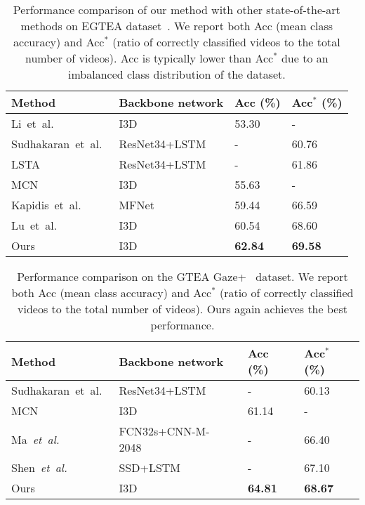 \documentclass[10pt,twocolumn,letterpaper]{article}
\begin{document}
\begin{table*}[t]
\centering
\begin{tabular}{L{4.6cm}|L{4.6cm}|C{2.3cm}|C{2.3cm}}
\toprule
Method & Backbone network & Acc (\%) & Acc$^{*}$ (\%) \\ \midrule
Li~et~al.~\cite{li2018eye} & I3D~\cite{carreira2017quo} & 53.30 & - \\
Sudhakaran~et~al.~\cite{sudhakaran2018attention} & ResNet34+LSTM~\cite{he2016deep,xingjian2015convolutional} & - & 60.76 \\
LSTA~\cite{sudhakaran2019lsta} & ResNet34+LSTM~\cite{he2016deep,xingjian2015convolutional} & - & 61.86 \\
MCN~\cite{huang2019mutual} & I3D~\cite{carreira2017quo} & 55.63 & - \\
Kapidis~et~al.~\cite{kapidis2019multitask} & MFNet~\cite{chen2018multi} & 59.44 & 66.59 \\
Lu~et~al.~\cite{lu2019learning} & I3D~\cite{carreira2017quo} & 60.54 & 68.60 \\ \midrule
Ours & I3D~\cite{carreira2017quo} & \textbf{62.84} & \textbf{69.58} \\
\bottomrule
\end{tabular}
\caption{Performance comparison of our method with other state-of-the-art methods on EGTEA dataset~\cite{li2018eye}. We report both Acc (mean class accuracy) and Acc$^{*}$ (ratio of correctly classified videos to the total number of videos). Acc is typically lower than Acc$^{*}$ due to an imbalanced class distribution of the dataset.}
\label{tab:act}
\end{table*}

\begin{table*}[t]
\centering
\begin{tabular}{L{4.6cm}|L{4.6cm}|C{2.3cm}|C{2.3cm}}
\toprule
Method & Backbone network & Acc (\%) & Acc$^{*}$ (\%) \\ \midrule
Sudhakaran~et~al.~\cite{sudhakaran2018attention} & ResNet34+LSTM~\cite{he2016deep,xingjian2015convolutional} & - & 60.13 \\
MCN~\cite{huang2019mutual} & I3D~\cite{carreira2017quo} & 61.14 & - \\
Ma~\textit{et~al.}~\cite{ma2016going} & FCN32s+CNN-M-2048~\cite{long2015fully,chatfield2014return} & - & 66.40 \\
Shen~\textit{et~al.}~\cite{shen2018egocentric} & SSD+LSTM~\cite{liu2016ssd} & - & 67.10 \\
\midrule
Ours & I3D~\cite{carreira2017quo} & \textbf{64.81} & \textbf{68.67} \\
\bottomrule
\end{tabular}
\caption{Performance comparison on the GTEA Gaze+~\cite{li2015delving} dataset. We report both Acc (mean class accuracy) and Acc$^{*}$ (ratio of correctly classified videos to the total number of videos). Ours again achieves the best performance.}
\label{tab:gtea}
\end{table*}
\end{document}
